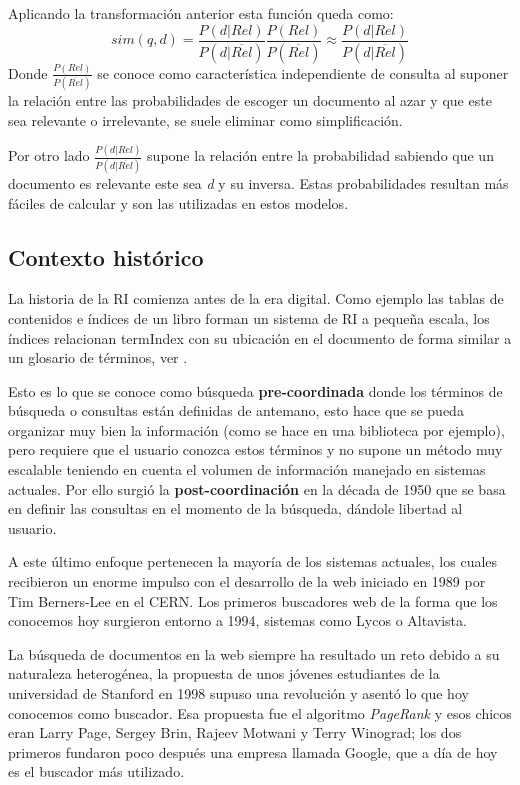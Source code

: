 \begin{list}{}{}
Aplicando la transformación anterior esta función queda como:
\begin{equation}
sim(q,d) = \frac{P(d|Rel)}{P(d|\overline{Rel})}\frac{P(Rel)}{P(\overline{Rel})} \approx \frac{P(d|Rel)}{P(d|\overline{Rel})}
\end{equation}
Donde $\frac{P(Rel)}{P(\overline{Rel})}$ se conoce como característica independiente de consulta\label{modelProb} al suponer la relación entre las probabilidades de escoger un documento al azar y que este sea relevante o irrelevante, se suele eliminar como simplificación. 

Por otro lado $\frac{P(d|Rel)}{P(d|\overline{Rel})}$ supone la relación entre la probabilidad sabiendo que un documento es relevante este sea \textit{d} y su inversa. Estas probabilidades resultan más fáciles de calcular y son las utilizadas en estos modelos.


\end{list}
\subsection{Contexto histórico}
La historia de la \acrshort{RI} comienza antes de la era digital. Como ejemplo las tablas de contenidos e índices de un libro forman un sistema de \acrshort{RI} a pequeña escala, los índices relacionan \gls{termIndex} con su ubicación en el documento de forma similar a un glosario de términos, ver  .

Esto es lo que se conoce como búsqueda \textbf{pre-coordinada} donde los términos de búsqueda o consultas están definidas de antemano, esto hace que se pueda organizar muy bien la información (como se hace en una biblioteca por ejemplo), pero requiere que el usuario conozca estos términos y no supone un método muy escalable teniendo en cuenta el volumen de información manejado en sistemas actuales. Por ello surgió la \textbf{post-coordinación} en la década de 1950 que se basa en definir las consultas en el momento de la búsqueda, dándole libertad al usuario.

A este último enfoque pertenecen la mayoría de los sistemas actuales, los cuales recibieron un enorme impulso con el desarrollo de la web iniciado en 1989 por Tim Berners-Lee en el CERN. Los primeros buscadores web de la forma que los conocemos hoy surgieron entorno a 1994, sistemas como Lycos o Altavista. 

La búsqueda de documentos en la web siempre ha resultado un reto debido a su naturaleza heterogénea, la propuesta de unos jóvenes estudiantes de la universidad de Stanford en 1998 supuso una revolución y asentó lo que hoy conocemos como buscador. Esa propuesta fue el algoritmo \textit{PageRank}\cite{PageRankPaper} y esos chicos eran Larry Page, Sergey Brin, Rajeev Motwani y Terry Winograd; los dos primeros fundaron poco después una empresa llamada Google, que a día de hoy es el buscador más utilizado. \cite{searchEngineShare}

